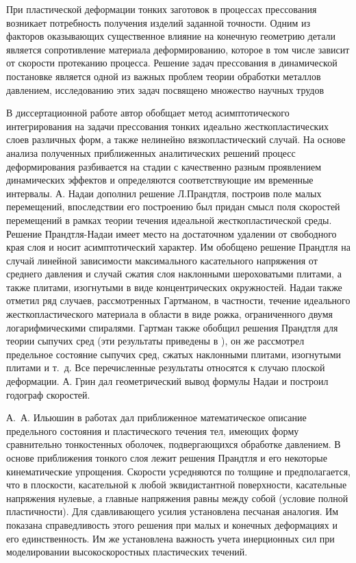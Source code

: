 При пластической деформации тонких заготовок в процессах прессования возникает потребность получения изделий заданной точности. Одним из факторов оказывающих существенное влияние на конечную геометрию детали является сопротивление материала деформированию, которое в том числе зависит от скорости протеканию процесса. Решение задач прессования в динамической постановке является одной из важных проблем теории обработки металлов давлением, исследованию этих задач посвящено множество научных трудов \autocite{Ilyushin:2009,Kiyko:2003,Bikovcev:1960,Georgievsky:2013}

В диссертационной работе автор обобщает метод асимптотического интегрирования на задачи прессования тонких идеально жесткопластических слоев различных форм, а также нелинейно вязкопластический случай. На основе анализа полученных приближенных аналитических решений процесс деформирования разбивается на стадии с качественно разным проявлением динамических эффектов и определяются соответствующие им временные интервалы.
\else
А. Надаи \autocite{Nadai:1954} дополнил решение Л.Прандтля, построив поле малых перемещений, впоследствии его построению был придан смысл поля скоростей перемещений в рамках теории течения идеальной жесткопластической среды. Решение Прандтля-Надаи имеет место на достаточном удалении от свободного края слоя и носит асимптотический характер. Им обобщено решение Прандтля на случай линейной зависимости максимального касательного напряжения от среднего давления и случай сжатия слоя наклонными шероховатыми плитами, а также плитами, изогнутыми в виде концентрических окружностей. Надаи также отметил ряд случаев, рассмотренных Гартманом, в частности, течение идеального жесткопластического материала в области в виде рожка, ограниченного двумя логарифмическими спиралями. Гартман также обобщил решения Прандтля для теории сыпучих сред (эти результаты приведены в \autocite{Nadai:1969}), он же рассмотрел предельное состояние сыпучих сред, сжатых наклонными плитами, изогнутыми плитами и т.~д. Все перечисленные результаты относятся к случаю плоской деформации.
А. Грин \autocite{Green:1954} дал геометрический вывод формулы Надаи и построил годограф скоростей.

А.~А. Ильюшин в работах \autocite{Ilyushin:1954,Ilyushin:1955} дал приближенное математическое описание предельного состояния и пластического течения тел, имеющих форму сравнительно тонкостенных оболочек, подвергающихся обработке давлением. В основе приближения тонкого слоя лежит решения Прандтля и его некоторые кинематические упрощения. Скорости усредняются по толщине и предполагается, что в плоскости, касательной к любой эквидистантной поверхности, касательные напряжения нулевые, а главные напряжения равны между собой (условие полной пластичности). Для сдавливающего усилия установлена песчаная аналогия. Им показана справедливость этого решения при малых и конечных деформациях и его единственность. Им же \autocite{Ilyushin:2009} установлена важность учета инерционных сил при моделировании высокоскоростных пластических течений.

